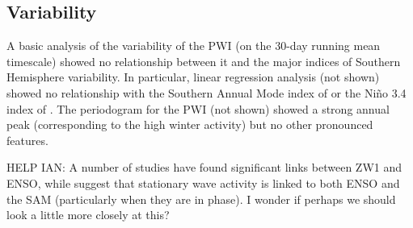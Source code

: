 \subsection{Variability}

A basic analysis of the variability of the PWI (on the 30-day running mean timescale) showed no relationship between it and the major indices of Southern Hemisphere variability. In particular, linear regression analysis (not shown) showed no relationship with the Southern Annual Mode index of \citet{Marshall2003} or the Ni\~{n}o 3.4 index of \citet{Trenberth2001}. The periodogram for the PWI (not shown) showed a strong annual peak (corresponding to the high winter activity) but no other pronounced features.

HELP IAN: A number of studies \citep[e.g.][]{Trenberth1980,Raphael2003} have found significant links between ZW1 and ENSO, while \citet{Pezza2012} suggest that stationary wave activity is linked to both ENSO and the SAM (particularly when they are in phase). I wonder if perhaps we should look a little more closely at this? 